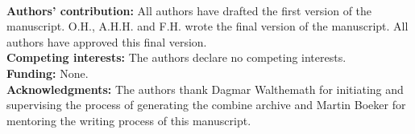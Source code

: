 \documentclass[a4paper, 12pt]{article}
\begin{document}

\newpage
{}







\\


\noindent\small \textbf{Authors' contribution:} All authors have drafted the first version of the manuscript. O.H., A.H.H. and F.H. wrote the final version of the manuscript. All authors have approved this final version. \\ 
\noindent\small \textbf{Competing interests:} The authors declare no competing interests.\\
\noindent\small \textbf{Funding:} None.\\
\noindent\small \textbf{Acknowledgments:} The authors thank Dagmar Walthemath  for initiating and supervising the process of generating the \ac{combine} archive and Martin Boeker  for mentoring the writing process of this manuscript.



\nocite{*}           %
\printbibliography 


\end{document}
